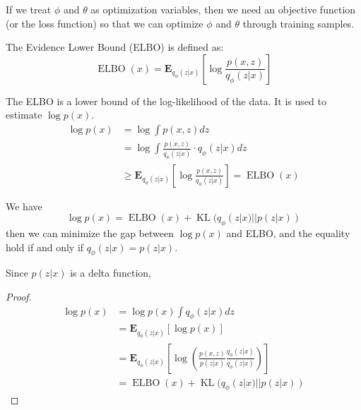If we treat $\phi$ and $\theta$ as optimization variables, then we need an objective function (or the loss function) so that we can optimize $\phi$ and $\theta$ through training samples.
\begin{definition}
    The Evidence Lower Bound (ELBO) is defined as:
    \begin{equation}
        \operatorname{ELBO}(x) = \mathbf{E}_{q_\phi(z|x)}\left[\log \frac{p(x, z)}{q_\phi(z|x)}\right]
    \end{equation}
\end{definition}
\begin{remark}
    The ELBO is a lower bound of the log-likelihood of the data. It is used to estimate $\log p(x)$.
    \begin{equation}
        \begin{aligned}
            \log p(x) &= \log \int p(x, z) dz\\
            & = \log \int \frac{p(x, z)}{q_\phi(z|x)} \cdot q_\phi(z|x) dz\\
            & \geq \mathbf{E}_{q_\phi(z|x)}\left[\log \frac{p(x, z)}{q_\phi(z|x)}\right] = \operatorname{ELBO}(x)
        \end{aligned}
    \end{equation}
\end{remark}
\begin{theorem}
    We have 
    \begin{equation}
        \log p(x) =\operatorname{ELBO}(x) + \operatorname{KL}(q_\phi(z|x)||p(z|x))
    \end{equation}
    then we can minimize the gap between $\log p(x)$ and ELBO, and the equality hold if and only if $q_\phi(z|x)=p(z|x)$.

    Since $p(z|x)$ is a delta function, 
\end{theorem}
\begin{proof}
    \begin{equation}
        \begin{aligned}
            \log p(x) & = \log p(x)\int q_\phi(z|x)dz\\
            &=\mathbf{E}_{q_\phi(z|x)}\left[\log p(x)\right]\\
            & = \mathbf{E}_{q_\phi(z|x)}\left[\log \left(\frac{p(x, z)}{p(z|x)}\frac{q_\phi(z|x)}{q_\phi(z|x)}\right)\right]\\
            & =\operatorname{ELBO}(x) + \operatorname{KL}(q_\phi(z|x)||p(z|x))
        \end{aligned}
    \end{equation}
\end{proof}

